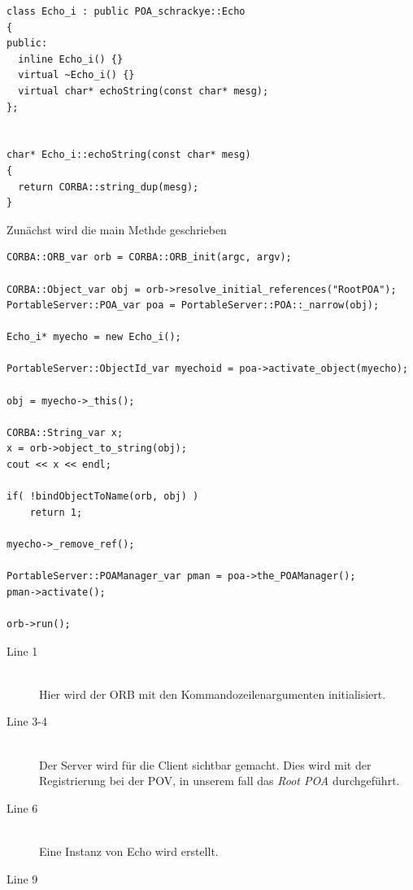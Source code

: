 \documentclass[11pt]{article}
\begin{document}
\begin{lstlisting}
class Echo_i : public POA_schrackye::Echo
{
public:
  inline Echo_i() {}
  virtual ~Echo_i() {}
  virtual char* echoString(const char* mesg);
};


char* Echo_i::echoString(const char* mesg)
{
  return CORBA::string_dup(mesg);
}
\end{lstlisting}



Zunächst wird die main Methde geschrieben

\begin{lstlisting}
CORBA::ORB_var orb = CORBA::ORB_init(argc, argv);

CORBA::Object_var obj = orb->resolve_initial_references("RootPOA");
PortableServer::POA_var poa = PortableServer::POA::_narrow(obj);

Echo_i* myecho = new Echo_i();

PortableServer::ObjectId_var myechoid = poa->activate_object(myecho);

obj = myecho->_this();

CORBA::String_var x;
x = orb->object_to_string(obj);
cout << x << endl;

if( !bindObjectToName(orb, obj) )
	return 1;

myecho->_remove_ref();

PortableServer::POAManager_var pman = poa->the_POAManager();
pman->activate();

orb->run();
\end{lstlisting}

\begin{description}

\item[Line 1] \hfill \\
Hier wird der ORB mit den Kommandozeilenargumenten initialisiert.

\item[Line 3-4] \hfill \\
Der Server wird für die Client sichtbar gemacht. Dies wird mit der Registrierung bei der POV, in unserem fall das \textit{Root POA} durchgeführt.

\item[Line 6] \hfill \\
Eine Instanz von Echo wird erstellt.

\item[Line 9] \hfill \\
\end{description}
\end{document}
